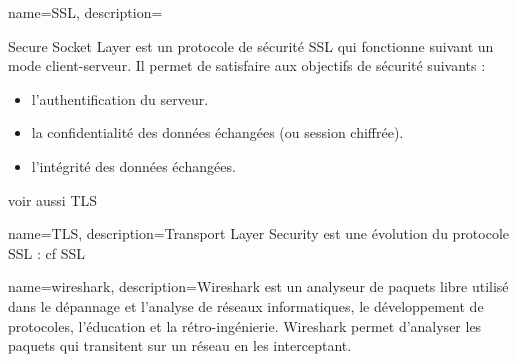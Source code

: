 
{
	name={SSL},
	description={Secure Socket Layer est un protocole de sécurité SSL qui fonctionne suivant un mode client-serveur. Il permet de satisfaire aux objectifs de sécurité suivants :\begin{itemize}
	\item l'authentification du serveur.
	\item la confidentialité des données échangées (ou session chiffrée).
	\item l'intégrité des données échangées.
	\end{itemize}
    voir aussi \gls{TLS}}
}

{
	name={TLS},
	description={Transport Layer Security est une évolution du protocole SSL : cf \gls{SSL}}
}

{
	name={wireshark},
	description={Wireshark est un analyseur de paquets libre utilisé dans le dépannage et l'analyse de réseaux informatiques, le développement de protocoles, l'éducation et la rétro-ingénierie. Wireshark permet d'analyser les paquets qui transitent sur un réseau en les interceptant.}
}


